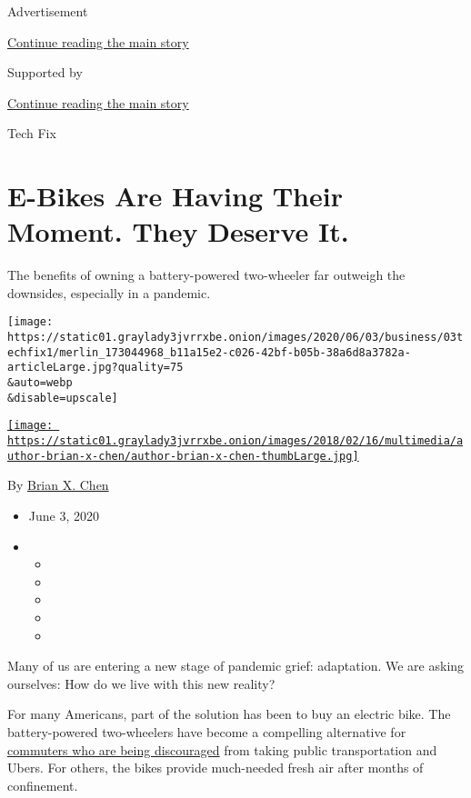 Advertisement

\protect\hyperlink{after-top}{Continue reading the main story}

Supported by

\protect\hyperlink{after-sponsor}{Continue reading the main story}

Tech Fix

\hypertarget{e-bikes-are-having-their-moment-they-deserve-it}{%
\section{E-Bikes Are Having Their Moment. They Deserve
It.}\label{e-bikes-are-having-their-moment-they-deserve-it}}

The benefits of owning a battery-powered two-wheeler far outweigh the
downsides, especially in a pandemic.

\texttt{[image: https://static01.graylady3jvrrxbe.onion/images/2020/06/03/business/03techfix1/merlin\_173044968\_b11a15e2-c026-42bf-b05b-38a6d8a3782a-articleLarge.jpg?quality=75\\\&auto=webp\\\&disable=upscale]}

\href{https://www.nytimes3xbfgragh.onion/by/brian-x-chen}{\texttt{[image: https://static01.graylady3jvrrxbe.onion/images/2018/02/16/multimedia/author-brian-x-chen/author-brian-x-chen-thumbLarge.jpg]}}

By \href{https://www.nytimes3xbfgragh.onion/by/brian-x-chen}{Brian X.
Chen}

\begin{itemize}
\item
  June 3, 2020
\item
  \begin{itemize}
  \item
  \item
  \item
  \item
  \item
  \end{itemize}
\end{itemize}

Many of us are entering a new stage of pandemic grief: adaptation. We
are asking ourselves: How do we live with this new reality?

For many Americans, part of the solution has been to buy an electric
bike. The battery-powered two-wheelers have become a compelling
alternative for
\href{https://www.nytimes3xbfgragh.onion/2020/05/28/health/cdc-coronavirus-offices.html?action=click\&module=Top\%20Stories\&pgtype=Homepage}{commuters
who are being discouraged} from taking public transportation and Ubers.
For others, the bikes provide much-needed fresh air after months of
confinement.

